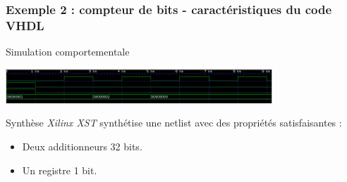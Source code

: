 \documentclass{beamer}
\begin{document}
\begin{frame}
  \frametitle{Exemple 2 : compteur de bits - caractéristiques du code VHDL}

  \begin{block}{Simulation comportementale}
    \vspace{0.3cm}
    \begin{center}
      \includegraphics[width=10cm]{capture-chrono-bitcompteur.png}
    \end{center}
  \end{block}

  \begin{block}{Synthèse}
    \textit{Xilinx XST} synthétise une netlist avec des propriétés
    satisfaisantes :

    \begin{itemize}
    \item Deux additionneurs 32 bits.
    \item Un registre 1 bit.
    \end{itemize}
  \end{block}
\end{frame}
\end{document}
